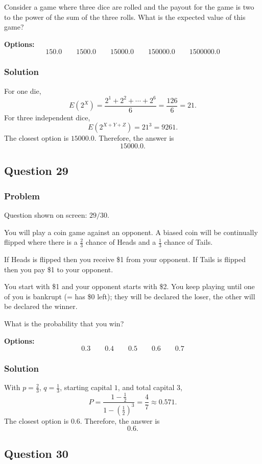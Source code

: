 \documentclass[12pt]{article}
\begin{document}
Consider a game where three dice are rolled and the payout for the game is two to the power of the sum of the three rolls. What is the expected value of this game?

\noindent\textbf{Options:}
\[
\boxed{150.0}
\qquad
\boxed{1500.0}
\qquad
\boxed{15000.0}
\qquad
\boxed{150000.0}
\qquad
\boxed{1500000.0}
\]

\subsubsection{Solution}
For one die,
\[
E(2^X)=\frac{2^1+2^2+\cdots+2^6}{6}
=\frac{126}{6}=21.
\]
For three independent dice,
\[
E(2^{X+Y+Z})=21^3=9261.
\]
The closest option is \(15000.0\). Therefore, the answer is
\[
\boxed{15000.0}.
\]

\subsection{Question 29}
\subsubsection{Problem}
Question shown on screen: \(29/30\).

You will play a coin game against an opponent. A biased coin will be continually flipped where there is a \(\frac{2}{3}\) chance of Heads and a \(\frac{1}{3}\) chance of Tails.

If Heads is flipped then you receive \$1 from your opponent. If Tails is flipped then you pay \$1 to your opponent.

You start with \$1 and your opponent starts with \$2. You keep playing until one of you is bankrupt (= has \$0 left); they will be declared the loser, the other will be declared the winner.

What is the probability that you win?

\noindent\textbf{Options:}
\[
\boxed{0.3}
\qquad
\boxed{0.4}
\qquad
\boxed{0.5}
\qquad
\boxed{0.6}
\qquad
\boxed{0.7}
\]

\subsubsection{Solution}
With \(p=\frac23\), \(q=\frac13\), starting capital \(1\), and total capital \(3\),
\[
P=\frac{1-\frac12}{1-\left(\frac12\right)^3}
=\frac{4}{7}\approx 0.571.
\]
The closest option is \(0.6\). Therefore, the answer is
\[
\boxed{0.6}.
\]

\subsection{Question 30}
\end{document}
